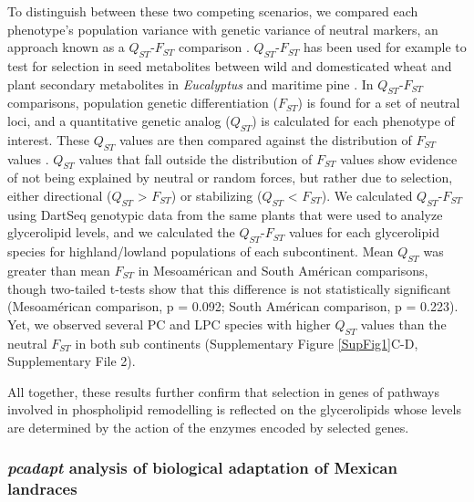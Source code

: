 \documentclass[9pt,twocolumn,twoside]{BioRxiv}
\begin{document}
To distinguish between these two competing scenarios, we compared each phenotype's population variance with genetic variance of neutral markers, an approach known as a $Q_{ST}$-$F_{ST}$ comparison \citep{Leinonen2013-ic}.
$Q_{ST}$-$F_{ST}$ has been used for example to test for selection in seed metabolites between wild and domesticated wheat \citep{Beleggia2016-xw} and plant secondary metabolites in \textit{Eucalyptus} \citep{o2013chemical} and maritime pine \citep{lopez2019genetic}.
In $Q_{ST}$-$F_{ST}$ comparisons, population genetic differentiation ($F_{ST}$) is found for a set of neutral loci, and a quantitative genetic analog ($Q_{ST}$) is calculated for each phenotype of interest.
These $Q_{ST}$ values are then compared against the distribution of $F_{ST}$ values \citep{whitlock2008evolutionary}.
$Q_{ST}$ values that fall outside the distribution of $F_{ST}$ values show evidence of not being explained by neutral or random forces, but rather due to selection, either directional ($Q_{ST}$ > $F_{ST}$) or stabilizing ($Q_{ST}$ < $F_{ST}$).
We calculated $Q_{ST}$-$F_{ST}$ using DartSeq genotypic data from the same plants that were used to analyze glycerolipid levels, and we calculated the $Q_{ST}$-$F_{ST}$ values for each glycerolipid species for highland/lowland populations of each subcontinent. 
Mean $Q_{ST}$ was greater than mean $F_{ST}$ in Mesoamérican and South Américan comparisons, though two-tailed t-tests show that this difference is not statistically significant (Mesoamérican comparison, p = 0.092; South Américan comparison, p = 0.223).
Yet, we observed several PC and LPC species with higher $Q_{ST}$ values than the neutral $F_{ST}$ in both sub continents (Supplementary Figure \ref{SupFig1}C-D, Supplementary File 2).

All together, these results further confirm that selection in genes of pathways involved in phospholipid remodelling is reflected on the glycerolipids whose levels are determined by the action of the enzymes encoded by selected genes.

\subsubsection{\textit{pcadapt} analysis of biological adaptation of Mexican landraces} 
\end{document}
